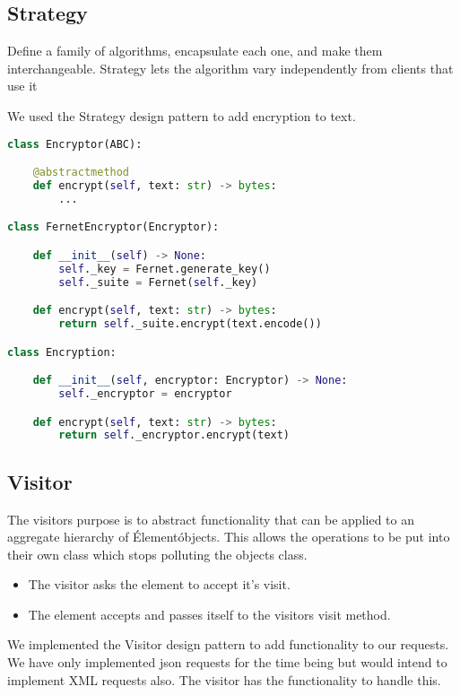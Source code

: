 \subsection{Strategy}
Define a family of algorithms, encapsulate each one, and make them interchangeable. Strategy lets the
algorithm vary independently from clients that use it~\citep{oodesign}

We used the Strategy design pattern to add encryption to text.


\begin{lstlisting}[language=Python]
class Encryptor(ABC):

	@abstractmethod
	def encrypt(self, text: str) -> bytes:
		...

class FernetEncryptor(Encryptor):

	def __init__(self) -> None:
		self._key = Fernet.generate_key()
		self._suite = Fernet(self._key)

	def encrypt(self, text: str) -> bytes:
		return self._suite.encrypt(text.encode())

class Encryption:

	def __init__(self, encryptor: Encryptor) -> None:
		self._encryptor = encryptor

	def encrypt(self, text: str) -> bytes:
		return self._encryptor.encrypt(text)
\end{lstlisting}

\subsection{Visitor}
The visitors purpose is to abstract functionality that can be applied to an aggregate hierarchy of \'Element\' objects. \cite{sourcemaking} This allows the operations to be put into their own class which stops polluting the objects class.
\begin{itemize}
	\item The visitor asks the element to accept it's visit.
	\item The element accepts and passes itself to the visitors visit method.
\end{itemize}

We implemented the Visitor design pattern to add functionality to our requests. We have only implemented json
requests for the time being but would intend to implement XML requests also. The visitor has the functionality
to handle this.

